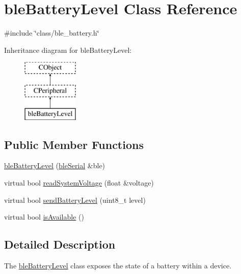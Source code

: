 \hypertarget{classble_battery_level}{\section{ble\-Battery\-Level Class Reference}
\label{classble_battery_level}
}


{\ttfamily \#include \char`\"{}class/ble\-\_\-battery.\-h\char`\"{}}

Inheritance diagram for ble\-Battery\-Level\-:\begin{figure}[H]
\begin{center}
\leavevmode
\includegraphics[height=3.000000cm]{d8/d3b/classble_battery_level}
\end{center}
\end{figure}
\subsection*{Public Member Functions}
\begin{DoxyCompactItemize}
\item 
\hyperlink{classble_battery_level_a212d349975b73b6f6020ce496ed68834}{ble\-Battery\-Level} (\hyperlink{classble_serial}{ble\-Serial} \&ble)
\item 
virtual bool \hyperlink{classble_battery_level_a2c6fae51a8653f720eb50169b094f7a5}{read\-System\-Voltage} (float \&voltage)
\item 
virtual bool \hyperlink{classble_battery_level_ad770083f87f2f193b897ca767593e716}{send\-Battery\-Level} (uint8\-\_\-t level)
\item 
virtual bool \hyperlink{classble_battery_level_a8cfd4674c5b405183b6b282e663849e4}{is\-Available} ()
\end{DoxyCompactItemize}


\subsection{Detailed Description}
The \hyperlink{classble_battery_level}{ble\-Battery\-Level} class exposes the state of a battery within a device. 

